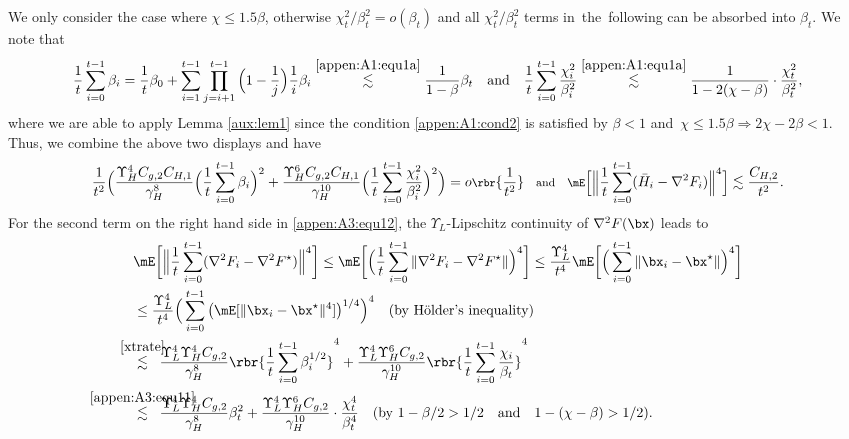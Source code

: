 We only consider the case where $\chi\leq 1.5\beta$, otherwise $\chi_t^2/\beta_t^2 = o(\beta_t)$ and all $\chi_t^2/\beta_t^2$ terms in~the~following can be absorbed into $\beta_t$. We note that
\begin{equation}\label{appen:A3:equ11}
\frac{1}{t}\sum_{i=0}^{t-1}\beta_i = \frac{1}{t}\beta_0 + \sum_{i=1}^{t-1}\prod_{j=i+1}^{t-1}\Big(1-\frac{1}{j}\Big)\frac{1}{i}\beta_i\stackrel{\eqref{appen:A1:equ1a}}{\lesssim} \frac{1}{1-\beta}\beta_t\quad\text{and}\quad \frac{1}{t}\sum_{i=0}^{t-1}\frac{\chi_i^2}{\beta_i^2} \stackrel{\eqref{appen:A1:equ1a}}{\lesssim} \frac{1}{1-2(\chi-\beta)}\cdot\frac{\chi_t^2}{\beta_t^2},
\end{equation}
where we are able to apply Lemma \ref{aux:lem1} since the condition \eqref{appen:A1:cond2} is satisfied by $\beta<1$ and~$\chi\leq 1.5\beta\Rightarrow 2\chi-2\beta<1$. Thus, we combine the above two displays and have
\begin{equation}\label{appen:A3:equ13}
\footnotesize \frac{1}{t^2}\bigg(\frac{\Upsilon_H^4 C_{g,2} C_{H,1}}{\gamma_H^8} \Big(\frac{1}{t}\sum_{i=0}^{t-1} \beta_i\Big)^2 + \frac{\Upsilon_H^6 C_{g,2} C_{H,1}}{\gamma_H^{10}}\Big(\frac{1}{t} \sum_{i=0}^{t-1} \frac{\chi_i^2}{\beta_i^2}\Big)^2 \bigg) = o\rbr{\frac{1}{t^2}} \quad \text{and} \quad \mE\bigg[\Big\|\frac{1}{t} \sum_{i=0}^{t-1}(\bar{H}_i-\nabla^2 F_i)\Big\|^4\bigg]\lesssim \frac{C_{H,2}}{t^2}.
\end{equation}
For the second term on the right hand side in \eqref{appen:A3:equ12}, the $\Upsilon_L$-Lipschitz continuity of $\nabla^2 F(\bx)$ leads to
\begin{align}\label{appen:A3:equ14}
&\mE\bigg[\Big\|\frac{1}{t} \sum_{i=0}^{t-1}(\nabla^2 F_i-\nabla^2 F^\star)\Big\|^4\bigg] \leq  \mE\bigg[\Big(\frac{1}{t} \sum_{i=0}^{t-1}\|\nabla^2 F_i-\nabla^2 F^\star\|\Big)^4\bigg]
\leq\frac{\Upsilon_{L}^4}{t^4} \mE\bigg[\Big(\sum_{i=0}^{t-1}\|\bx_i-\bx^\star\|\Big)^4\bigg]\nonumber\\
&\leq \frac{\Upsilon_{L}^4}{t^4} \Big(\sum_{i=0}^{t-1}\big(\mE[\|\bx_i-\bx^\star\|^4]\big)^{1/4}\Big)^4 \quad (\text{by H\"older's inequality})\nonumber\\
&\stackrel{\mathclap{\eqref{xtrate}}}{\lesssim}\;\; \frac{\Upsilon_{L}^4\Upsilon_H^4C_{g,2}}{\gamma_H^8} \rbr{\frac{1}{t}\sum_{i=0}^{t-1}\beta_i^{1/2}}^4 + \frac{\Upsilon_{L}^4\Upsilon_H^6C_{g,2}}{\gamma_H^{10}}\rbr{\frac{1}{t}\sum_{i=0}^{t-1}\frac{\chi_i}{\beta_t}}^4\nonumber\\
&\stackrel{\mathclap{\eqref{appen:A3:equ11}}}{\lesssim}\;\; \frac{\Upsilon_{L}^4\Upsilon_H^4C_{g,2}}{\gamma_H^8} \beta_t^2 + \frac{\Upsilon_{L}^4\Upsilon_H^6C_{g,2}}{\gamma_H^{10}}\cdot \frac{\chi_t^4}{\beta_t^4}\quad (\text{by }1-\beta/2>1/2\quad\text{and}\quad 1-(\chi-\beta)>1/2).
\end{align}
